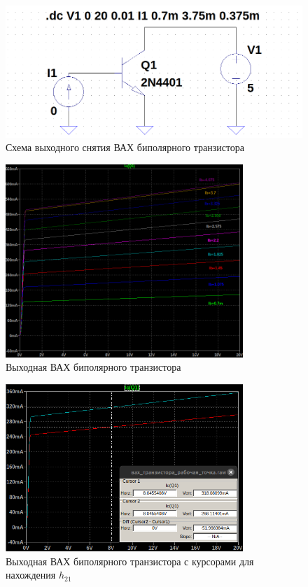 \begin{figure}[H]
    \centering
    \includegraphics[width=1\textwidth]{figs/схемавахдлявыхода.png}
    \caption{Схема выходного снятия ВАХ биполярного транзистора}
    \label{fig:схемавахдлявыхода}
\end{figure}

\begin{figure}[H]
    \centering
    \includegraphics[width=0.8\textwidth]{figs/выходвах.png}
    \caption{Выходная ВАХ биполярного транзистора}
    \label{fig:выходвах}
\end{figure}

\begin{figure}[H]
    \centering
    \includegraphics[width=0.8\textwidth]{figs/h21.png}
    \caption{Выходная ВАХ биполярного транзистора с курсорами для нахождения $h_{21}$}
    \label{fig:h21}
\end{figure}

